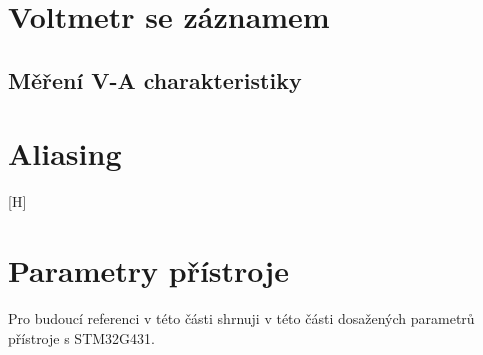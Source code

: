 \section{Voltmetr se záznamem}
\subsection{Měření V-A charakteristiky}
\section{Aliasing}[H]
\newpage
\section{Parametry přístroje}
Pro budoucí referenci v této části shrnuji v této části dosažených parametrů přístroje s STM32G431.
